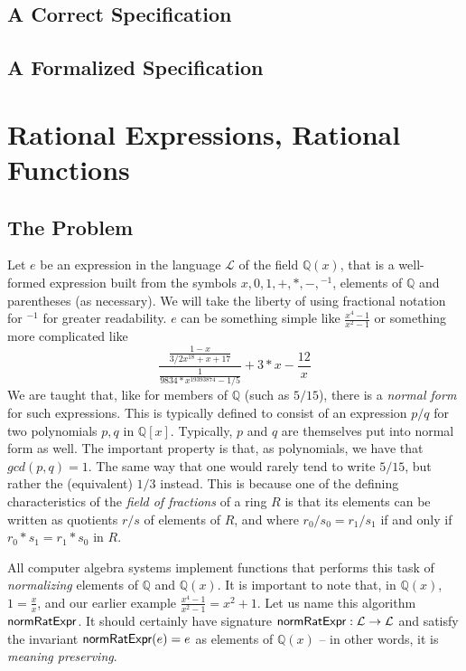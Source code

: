 \documentclass[fleqn]{llncs}
\begin{document}
\subsection{A Correct Specification}

\subsection{A Formalized Specification}

\newcommand{\QQ}{\ensuremath{\mathbb{Q}}}
\newcommand{\NRE}{\ensuremath{\mname{normRatExpr}}}
\newcommand{\funQ}[1]{\ensuremath{\LambdaApp x : \QQ \mdot#1}}
\newcommand{\Lang}{\ensuremath{\mathcal{L}}}

\section{Rational Expressions, Rational Functions}

\subsection{The Problem}

Let $e$ be an expression in the language $\Lang$ of the field $\QQ(x)$,
that is a well-formed expression built from the symbols $x, 0, 1, +, *, -,
\phantom{}^{-1}$, elements of $\QQ$ and parentheses (as necessary). We
will take the liberty of using fractional notation for
$\phantom{}^{-1}$ for greater readability.  $e$ can be
something simple like $\frac{x^4-1}{x^2-1}$ or something more complicated
like 
\begin{equation*}
\frac{\frac{1-x}{3/2 x^{18} + x + 17}}{\frac{1}{9834*x^{19393874}-1/5}}+3*x
-\frac{12}{x}
\end{equation*}
We are taught that, like for members of $\QQ$ (such as $5/15$), there is
a \emph{normal form} for such expressions. This is typically defined
to consist of an expression $p/q$ for two polynomials $p,q$ in
$\QQ\left[x\right]$. Typically, $p$ and $q$ are themselves put into
normal form as well. The important property is that, as polynomials,
we have that $\mathit{gcd}\left(p,q\right) = 1$. The same way that
one would rarely tend to write $5/15$, but rather the (equivalent) $1/3$
instead.  This is because one of the defining characteristics of the
\emph{field of fractions} of a ring $R$ is that its elements can be
written as quotients $r/s$ of elements of $R$, and where $r_0/s_0 = r_1/s_1$
if and only if $r_0 * s_1 = r_1 * s_0$ in $R$.

All computer algebra systems implement functions that performs
this task of \emph{normalizing} elements of $\QQ$ and $\QQ(x)$.
It is important to note that, in $\QQ(x)$, $ 1 = \frac{x}{x}$, and
our earlier example $\frac{x^4-1}{x^2-1} = x^2+1$.  Let us name
this algorithm \NRE. It should certainly have
signature $\NRE : \Lang \rightarrow \Lang$ and
satisfy the invariant $\NRE(e) = e$ as elements of $\QQ(x)$ --
in other words, it is \emph{meaning preserving}.
\end{document}
